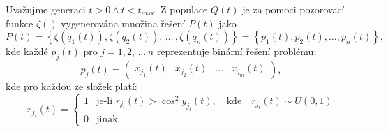 Uvažujme generaci $t>0 \wedge t<t_{\text{max}}$. Z populace $Q\left(t\right)$ je za pomoci pozorovací funkce $\zeta\left(\right)$ vygenerována množina řešení $P\left(t\right)$ jako
\begin{equation}
    P\left(t\right) = \left\{\zeta\left(q_1\left(t\right)\right), \zeta\left(q_2\left(t\right)\right), \,\dots\, , \zeta\left(q_n\left(t\right)\right) \right\} = \left\{ p_1\left(t\right), p_2\left(t\right), \dots, p_n\left(t\right) \right\},
\end{equation}
kde každé $p_j\left(t\right)$ pro $j=1,2,\,\dots\,n$ reprezentuje binární řešení problému:
\begin{equation*}
    p_j\left(t\right) = 
    \begin{pmatrix}
        x_{j_1}\left(t\right) & x_{j_2}\left(t\right) & \dots & x_{j_m}\left(t\right)
    \end{pmatrix},
\end{equation*}
kde pro každou ze složek platí:
\begin{equation*}
    x_{j_i}\left(t\right) =
    \begin{cases}
      1 & \text{je-li } r_{j_i}\left(t\right) >\cos^2 y_{j_i}\left(t\right),\quad\text{kde}\quad r_{j_i}\left(t\right) \sim U\left(0,1\right)\\
      0 & \text{jinak.}
    \end{cases}
\end{equation*}

